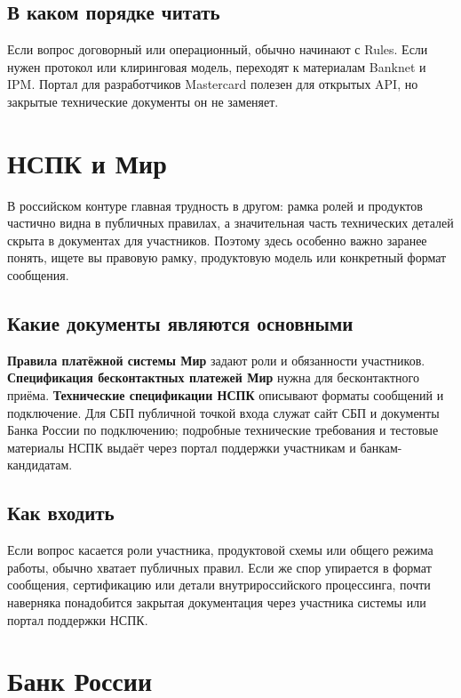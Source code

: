 \subsection*{В каком порядке читать}

Если вопрос договорный или операционный, обычно начинают
с Rules. Если нужен протокол или клиринговая модель, переходят
к материалам Banknet и IPM. Портал для разработчиков Mastercard
полезен для открытых API, но закрытые технические документы
он не заменяет.

\section{НСПК и Мир}
\label{sec:ps-nspk}

В российском контуре главная трудность в другом: рамка ролей
и продуктов частично видна в публичных правилах, а значительная
часть технических деталей скрыта в документах для участников.
Поэтому здесь особенно важно заранее понять, ищете вы правовую
рамку, продуктовую модель или конкретный формат сообщения.

\subsection*{Какие документы являются основными}

\textbf{Правила платёжной системы Мир} задают роли и обязанности
участников. \textbf{Спецификация бесконтактных платежей Мир}
нужна для бесконтактного приёма. \textbf{Технические спецификации
НСПК} описывают форматы сообщений и подключение. Для СБП публичной
точкой входа служат сайт СБП и документы Банка России по подключению;
подробные технические требования и тестовые материалы НСПК выдаёт
через портал поддержки участникам и банкам-кандидатам.

\subsection*{Как входить}

Если вопрос касается роли участника, продуктовой схемы или общего
режима работы, обычно хватает публичных правил. Если же спор
упирается в формат сообщения, сертификацию или детали
внутрироссийского процессинга, почти наверняка понадобится
закрытая документация через участника системы или портал поддержки
НСПК.

\section{Банк России}
\label{sec:ps-cbr}

